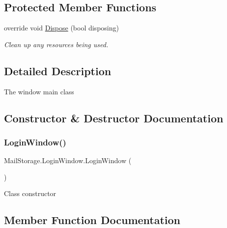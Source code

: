 \subsection*{Protected Member Functions}
\begin{DoxyCompactItemize}
\item 
override void \hyperlink{class_mail_storage_1_1_login_window_a974820001e831196d189c51d64782cfc}{Dispose} (bool disposing)
\begin{DoxyCompactList}\small\item\em Clean up any resources being used. \end{DoxyCompactList}\end{DoxyCompactItemize}


\subsection{Detailed Description}
The window main class 



\subsection{Constructor \& Destructor Documentation}
\mbox{\label{class_mail_storage_1_1_login_window_a753823a2cafd3253de32a8210d7e0edf}} 
\subsubsection{\texorpdfstring{Login\+Window()}{LoginWindow()}}
{\footnotesize\ttfamily Mail\+Storage.\+Login\+Window.\+Login\+Window (\begin{DoxyParamCaption}{ }\end{DoxyParamCaption})}



Class constructor 



\subsection{Member Function Documentation}
\mbox{\label{class_mail_storage_1_1_login_window_a974820001e831196d189c51d64782cfc}} 
